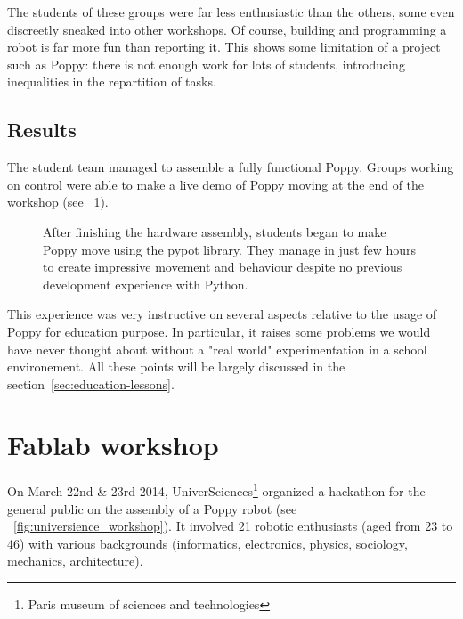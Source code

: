 The students of these groups were far less enthusiastic than the others, some even discreetly sneaked into other workshops. Of course, building and programming a robot is  far more fun than reporting it. This shows some limitation of a project such as Poppy: there is not enough work for lots of students, introducing inequalities in the repartition of tasks.

\subsection{Results} %

The student team managed to assemble a fully functional Poppy. Groups working on control were able to make a live demo of Poppy moving at the end of the workshop (see \figurename~\ref{fig:saintonge_demonstration}).

\begin{figure}[tb]
\centering
    \hfil
    \caption{After finishing the hardware assembly, students began to make Poppy move using the pypot library. They manage in just few hours to create impressive movement and behaviour despite no previous development experience with Python.}
    \label{fig:saintonge_demonstration}
\end{figure}

This experience was very instructive on several aspects relative to the usage of Poppy for education purpose. In particular, it raises some problems we would have never thought about without a "real world" experimentation in a school environement. All these points will be largely discussed in the section~\ref{sec:education-lessons}.

\newpage
\section{Fablab workshop} %
\label{sec:poppy_universience}

On March 22nd \& 23rd 2014, UniverSciences\footnote{Paris museum of sciences and technologies} organized a hackathon for the general public on the assembly of a Poppy robot (see \figurename~\ref{fig:universience_workshop}).
It involved 21 robotic enthusiasts (aged from 23 to 46) with various backgrounds (informatics, electronics, physics, sociology, mechanics, architecture).

